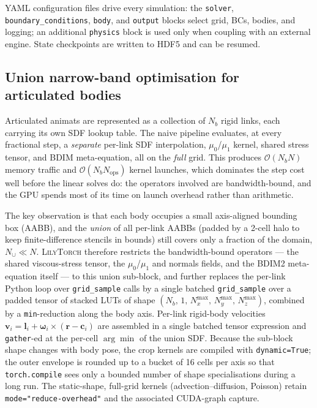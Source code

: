 \documentclass[journal,twoside,10pt]{IEEEtran}
\newcommand{\lilytorch}{\textsc{LilyTorch}\xspace}
\begin{document}
YAML configuration files drive every simulation: the
\texttt{solver}, \texttt{boundary\_conditions}, \texttt{body}, and
\texttt{output} blocks select grid, BCs, bodies, and logging; an
additional \texttt{physics} block is used only when coupling with an
external engine.  State checkpoints are written to HDF5 and can be resumed.


\subsection{Union narrow-band optimisation for articulated bodies}\label{sec:union-narrow-band}

Articulated animats are represented as a collection of $N_b$ rigid
links, each carrying its own SDF lookup table.  The naive pipeline
evaluates, at every fractional step, a \emph{separate} per-link SDF
interpolation, $\mu_0$/$\mu_1$ kernel, shared stress tensor, and BDIM
meta-equation, all on the \emph{full} grid.  This produces
$\mathcal O(N_b N)$ memory traffic and $\mathcal O(N_b N_{\text{ops}})$
kernel launches, which dominates the step cost well before the linear
solves do: the operators involved are bandwidth-bound, and the GPU
spends most of its time on launch overhead rather than arithmetic.

The key observation is that each body occupies a small axis-aligned
bounding box (AABB), and the \emph{union} of all per-link AABBs
(padded by a 2-cell halo to keep finite-difference stencils in bounds)
still covers only a fraction of the domain,
$N_\cup \ll N$.  \lilytorch therefore restricts the bandwidth-bound
operators --- the shared viscous-stress tensor, the $\mu_0$/$\mu_1$
and normals fields, and the BDIM2 meta-equation itself --- to this
union sub-block, and further replaces the per-link Python loop over
\texttt{grid\_sample} calls by a single batched
\texttt{grid\_sample} over a padded tensor of stacked LUTs of shape
$(N_b,\,1,\,N_x^{\max},\,N_y^{\max},\,N_z^{\max})$, combined by a
\texttt{min}-reduction along the body axis.  Per-link rigid-body
velocities $\mathbf v_i = \mathbf l_i + \boldsymbol\omega_i \times
(\mathbf r - \mathbf c_i)$ are assembled in a single batched tensor
expression and \texttt{gather}-ed at the per-cell
$\arg\min$ of the union SDF.  Because the sub-block shape changes
with body pose, the crop kernels are compiled with
\texttt{dynamic=True}; the outer envelope is rounded up to a bucket
of 16 cells per axis so that \texttt{torch.compile} sees only a
bounded number of shape specialisations during a long run.  The
static-shape, full-grid kernels (advection--diffusion, Poisson) retain
\texttt{mode="reduce-overhead"} and the associated CUDA-graph
capture.
\end{document}
